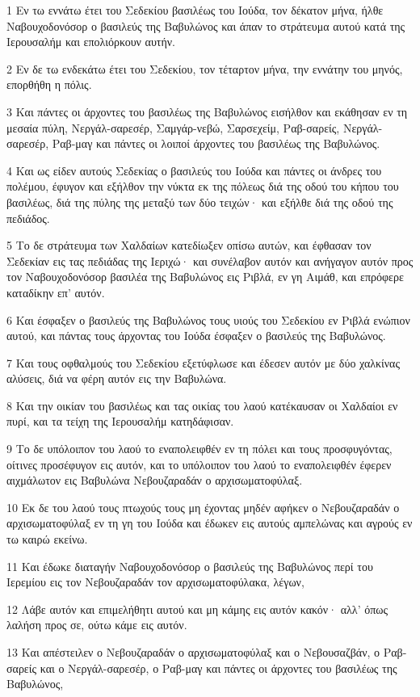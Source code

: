 \par 1 Εν τω εννάτω έτει του Σεδεκίου βασιλέως του Ιούδα, τον δέκατον μήνα, ήλθε Ναβουχοδονόσορ ο βασιλεύς της Βαβυλώνος και άπαν το στράτευμα αυτού κατά της Ιερουσαλήμ και επολιόρκουν αυτήν.
\par 2 Εν δε τω ενδεκάτω έτει του Σεδεκίου, τον τέταρτον μήνα, την εννάτην του μηνός, επορθήθη η πόλις.
\par 3 Και πάντες οι άρχοντες του βασιλέως της Βαβυλώνος εισήλθον και εκάθησαν εν τη μεσαία πύλη, Νεργάλ-σαρεσέρ, Σαμγάρ-νεβώ, Σαρσεχείμ, Ραβ-σαρείς, Νεργάλ-σαρεσέρ, Ραβ-μαγ και πάντες οι λοιποί άρχοντες του βασιλέως της Βαβυλώνος.
\par 4 Και ως είδεν αυτούς Σεδεκίας ο βασιλεύς του Ιούδα και πάντες οι άνδρες του πολέμου, έφυγον και εξήλθον την νύκτα εκ της πόλεως διά της οδού του κήπου του βασιλέως, διά της πύλης της μεταξύ των δύο τειχών· και εξήλθε διά της οδού της πεδιάδος.
\par 5 Το δε στράτευμα των Χαλδαίων κατεδίωξεν οπίσω αυτών, και έφθασαν τον Σεδεκίαν εις τας πεδιάδας της Ιεριχώ· και συνέλαβον αυτόν και ανήγαγον αυτόν προς τον Ναβουχοδονόσορ βασιλέα της Βαβυλώνος εις Ριβλά, εν γη Αιμάθ, και επρόφερε καταδίκην επ' αυτόν.
\par 6 Και έσφαξεν ο βασιλεύς της Βαβυλώνος τους υιούς του Σεδεκίου εν Ριβλά ενώπιον αυτού, και πάντας τους άρχοντας του Ιούδα έσφαξεν ο βασιλεύς της Βαβυλώνος.
\par 7 Και τους οφθαλμούς του Σεδεκίου εξετύφλωσε και έδεσεν αυτόν με δύο χαλκίνας αλύσεις, διά να φέρη αυτόν εις την Βαβυλώνα.
\par 8 Και την οικίαν του βασιλέως και τας οικίας του λαού κατέκαυσαν οι Χαλδαίοι εν πυρί, και τα τείχη της Ιερουσαλήμ κατηδάφισαν.
\par 9 Το δε υπόλοιπον του λαού το εναπολειφθέν εν τη πόλει και τους προσφυγόντας, οίτινες προσέφυγον εις αυτόν, και το υπόλοιπον του λαού το εναπολειφθέν έφερεν αιχμάλωτον εις Βαβυλώνα Νεβουζαραδάν ο αρχισωματοφύλαξ.
\par 10 Εκ δε του λαού τους πτωχούς τους μη έχοντας μηδέν αφήκεν ο Νεβουζαραδάν ο αρχισωματοφύλαξ εν τη γη του Ιούδα και έδωκεν εις αυτούς αμπελώνας και αγρούς εν τω καιρώ εκείνω.
\par 11 Και έδωκε διαταγήν Ναβουχοδονόσορ ο βασιλεύς της Βαβυλώνος περί του Ιερεμίου εις τον Νεβουζαραδάν τον αρχισωματοφύλακα, λέγων,
\par 12 Λάβε αυτόν και επιμελήθητι αυτού και μη κάμης εις αυτόν κακόν· αλλ' όπως λαλήση προς σε, ούτω κάμε εις αυτόν.
\par 13 Και απέστειλεν ο Νεβουζαραδάν ο αρχισωματοφύλαξ και ο Νεβουσαζβάν, ο Ραβ-σαρείς και ο Νεργάλ-σαρεσέρ, ο Ραβ-μαγ και πάντες οι άρχοντες του βασιλέως της Βαβυλώνος,
